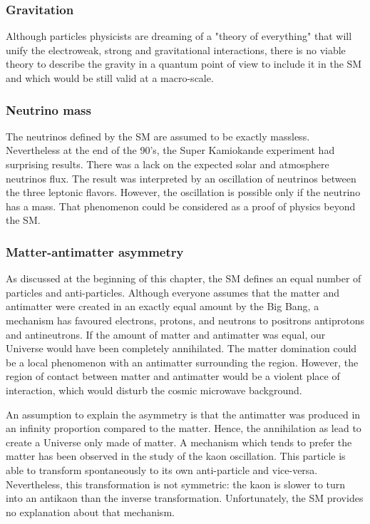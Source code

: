     \subsubsection{Gravitation}

    Although particles physicists are dreaming of a "theory of everything" that will unify the electroweak, strong and gravitational interactions,
    there is no viable theory to describe the gravity in a quantum point of view to include it in the \gls{SM} and which would be still valid at a macro-scale.

    \subsubsection{Neutrino mass}

    The neutrinos defined by the \gls{SM} are assumed to be exactly massless.
    Nevertheless at the end of the 90's, the Super Kamiokande experiment had surprising results.
    There was a lack on the expected solar and atmosphere neutrinos flux. 
    The result was interpreted by an oscillation of neutrinos between the three leptonic flavors.
    However, the oscillation is possible only if the neutrino has a mass.
    That phenomenon could be considered as a proof of physics beyond the \gls{SM}.

    \subsubsection{Matter-antimatter asymmetry}

    As discussed at the beginning of this chapter, the \gls{SM} defines an equal number of particles and anti-particles. 
    Although everyone assumes that the matter and antimatter were created in an exactly equal amount by the Big Bang, a mechanism has favoured electrons, protons, and neutrons to positrons antiprotons and antineutrons.
    If the amount of matter and antimatter was equal, our Universe would have been completely annihilated.
    The matter domination could be a local phenomenon with an antimatter surrounding the region. 
    However, the region of contact between matter and antimatter would be a violent place of interaction, which would disturb the cosmic microwave background.

    An assumption to explain the asymmetry is that the antimatter was produced in an infinity proportion compared to the matter.
    Hence, the annihilation as lead to create a Universe only made of matter.
    A mechanism which tends to prefer the matter has been observed in the study of the kaon oscillation.
    This particle is able to transform spontaneously to its own anti-particle and vice-versa.
    Nevertheless, this transformation is not symmetric: the kaon is slower to turn into an antikaon than the inverse transformation.
    Unfortunately, the \gls{SM} provides no explanation about that mechanism.
 
